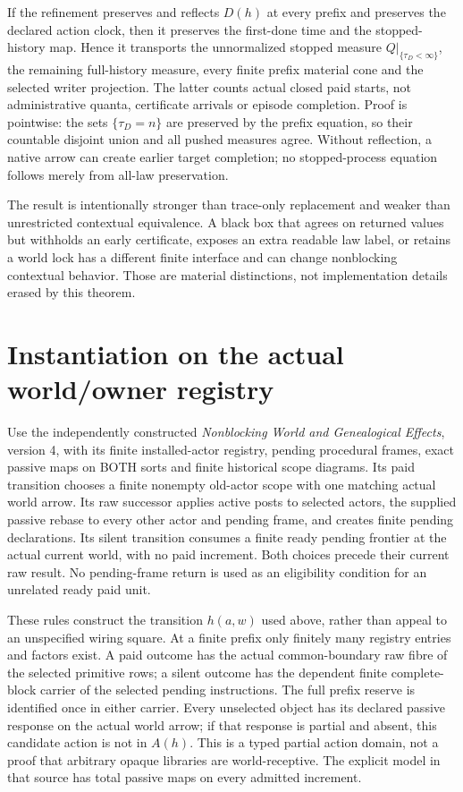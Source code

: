 \documentclass{article}
\begin{document}
If the refinement preserves and reflects $D(h)$ at every prefix and preserves the declared action clock, then it preserves the first-done time and the stopped-history map. Hence it transports the unnormalized stopped measure $Q\vert_{\{\tau_D<\infty\}}$, the remaining full-history measure, every finite prefix material cone and the selected writer projection. The latter counts actual closed paid starts, not administrative quanta, certificate arrivals or episode completion. Proof is pointwise: the sets $\{\tau_D=n\}$ are preserved by the prefix equation, so their countable disjoint union and all pushed measures agree. Without reflection, a native arrow can create earlier target completion; no stopped-process equation follows merely from all-law preservation.

The result is intentionally stronger than trace-only replacement and weaker than unrestricted contextual equivalence. A black box that agrees on returned values but withholds an early certificate, exposes an extra readable law label, or retains a world lock has a different finite interface and can change nonblocking contextual behavior. Those are material distinctions, not implementation details erased by this theorem.


\section{Instantiation on the actual world/owner registry}
Use the independently constructed \emph{Nonblocking World and Genealogical Effects}, version 4, with its finite installed-actor registry, pending procedural frames, exact passive maps on BOTH sorts and finite historical scope diagrams. Its paid transition chooses a finite nonempty old-actor scope with one matching actual world arrow. Its raw successor applies active posts to selected actors, the supplied passive rebase to every other actor and pending frame, and creates finite pending declarations. Its silent transition consumes a finite ready pending frontier at the actual current world, with no paid increment. Both choices precede their current raw result. No pending-frame return is used as an eligibility condition for an unrelated ready paid unit.

These rules construct the transition $h(a,w)$ used above, rather than appeal to an unspecified wiring square. At a finite prefix only finitely many registry entries and factors exist. A paid outcome has the actual common-boundary raw fibre of the selected primitive rows; a silent outcome has the dependent finite complete-block carrier of the selected pending instructions. The full prefix reserve is identified once in either carrier. Every unselected object has its declared passive response on the actual world arrow; if that response is partial and absent, this candidate action is not in $A(h)$. This is a typed partial action domain, not a proof that arbitrary opaque libraries are world-receptive. The explicit model in that source has total passive maps on every admitted increment.
\end{document}

